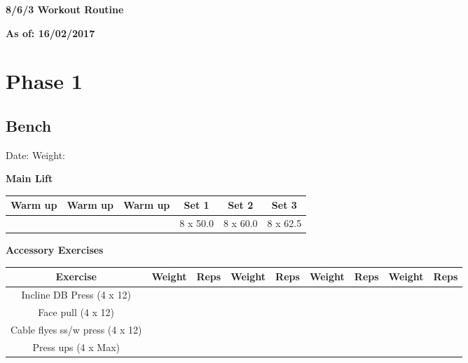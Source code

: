 \documentclass{article}%
\begin{document}
%
\normalsize%
\pagestyle{header}%
\linebreak%
\begin{Large}%
\textbf{8/6/3 Workout Routine}%
\end{Large}%
\linebreak%
\begin{large}%
\textbf{As of: 16/02/2017}%
\end{large}%
\linebreak%
\section*{Phase 1}%
\subsection*{Bench}%
Date: %
\linebreak%
Weight: %
\vspace*{20pt}%
\linebreak%
\begin{minipage}{0.5\textwidth}%
\textbf{Main Lift\newline%
\newline%
}%
\begin{tabular}{|c|c|c|c|c|c|}%
\hline%
Warm up&Warm up&Warm up&Set 1&Set 2&Set 3\\%
\hline%
&&&8 x 50.0&8 x 60.0&8 x 62.5\\%
\hline%
\end{tabular}%
\vspace*{20pt}%
\linebreak%
\textbf{Accessory Exercises\newline%
\newline%
}%
\begin{tabular}{|c|c|c|c|c|c|c|c|c|}%
\hline%
Exercise&Weight&Reps&Weight&Reps&Weight&Reps&Weight&Reps\\%
\hline%
Incline DB Press (4 x 12)&&&&&&&&\\%
\hline%
Face pull (4 x 12)&&&&&&&&\\%
\hline%
Cable flyes ss/w press (4 x 12)&&&&&&&&\\%
\hline%
Press ups (4 x Max)&&&&&&&&\\%
\hline%
\end{tabular}%
\end{minipage}%
\vspace*{20pt}%
\linebreak

%
\end{document}
